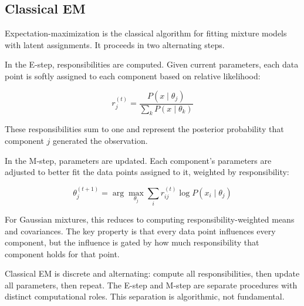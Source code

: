 \subsection{Classical EM}

Expectation-maximization is the classical algorithm for fitting mixture models with latent assignments. It proceeds in two alternating steps.

In the E-step, responsibilities are computed. Given current parameters, each data point is softly assigned to each component based on relative likelihood:

\[
r_j^{(t)} = \frac{P(x \mid \theta_j)}{\sum_k P(x \mid \theta_k)}
\]

These responsibilities sum to one and represent the posterior probability that component $j$ generated the observation.

In the M-step, parameters are updated. Each component's parameters are adjusted to better fit the data points assigned to it, weighted by responsibility:

\[
\theta_j^{(t+1)} = \arg\max_{\theta_j} \sum_i r_{ij}^{(t)} \log P(x_i \mid \theta_j)
\]

For Gaussian mixtures, this reduces to computing responsibility-weighted means and covariances. The key property is that every data point influences every component, but the influence is gated by how much responsibility that component holds for that point.

Classical EM is discrete and alternating: compute all responsibilities, then update all parameters, then repeat. The E-step and M-step are separate procedures with distinct computational roles. This separation is algorithmic, not fundamental.
